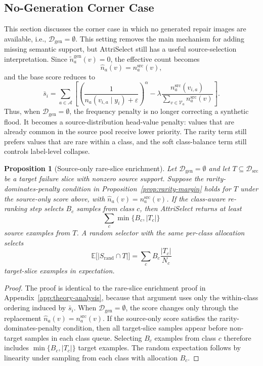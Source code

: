 \documentclass{article}
\newcommand{\model}{AttriSelect\xspace}
\newcommand{\dataset}{\mathcal{D}}
\newcommand{\attrs}{\mathcal{A}}
\newcommand{\vals}{\mathcal{V}}
\newtheorem{proposition}{Proposition}
\begin{document}
\subsection{No-Generation Corner Case}
\label{app:no-generation-corner-case}

This section discusses the corner case in which no generated repair images are available, i.e., $\dataset_{\mathrm{gen}}=\emptyset$. This setting removes the main mechanism for adding missing semantic support, but \model still has a useful source-selection interpretation. Since $\tilde{n}_a^{\mathrm{gen}}(v)=0$, the effective count becomes
\begin{equation}
\hat{n}_a(v)=n_a^{\mathrm{src}}(v),
\end{equation}
and the base score reduces to
\begin{equation}
\bar{s}_i
=
\sum_{a \in \attrs}
\left[
\left(\frac{1}{n_a(v_{i,a}\mid y_i)+\varepsilon}\right)^\alpha
-
\lambda
\frac{n_a^{\mathrm{src}}(v_{i,a})}{\sum_{v\in\vals_a} n_a^{\mathrm{src}}(v)}
\right].
\end{equation}
Thus, when $\dataset_{\mathrm{gen}}=\emptyset$, the frequency penalty is no longer correcting a synthetic flood. It becomes a source-distribution head-value penalty: values that are already common in the source pool receive lower priority. The rarity term still prefers values that are rare within a class, and the soft class-balance term still controls label-level collapse.

\begin{proposition}[Source-only rare-slice enrichment]
Let $\dataset_{\mathrm{gen}}=\emptyset$ and let $T\subseteq\dataset_{\mathrm{src}}$ be a target failure slice with nonzero source support. Suppose the rarity-dominates-penalty condition in Proposition~\ref{prop:rarity-margin} holds for $T$ under the source-only score above, with $\hat{n}_a(v)=n_a^{\mathrm{src}}(v)$. If the class-aware re-ranking step selects $B_c$ samples from class $c$, then \model returns at least
\begin{equation}
\sum_c \min\{B_c, |T_c|\}
\end{equation}
source examples from $T$. A random selector with the same per-class allocation selects
\begin{equation}
\mathbb{E}\big[|S_{\mathrm{rand}}\cap T|\big]
=
\sum_c B_c\frac{|T_c|}{N_c}
\end{equation}
target-slice examples in expectation.
\end{proposition}

\begin{proof}
The proof is identical to the rare-slice enrichment proof in Appendix~\ref{app:theory-analysis}, because that argument uses only the within-class ordering induced by $\bar{s}_i$. When $\dataset_{\mathrm{gen}}=\emptyset$, the score changes only through the replacement $\hat{n}_a(v)=n_a^{\mathrm{src}}(v)$. If the source-only score satisfies the rarity-dominates-penalty condition, then all target-slice samples appear before non-target samples in each class queue. Selecting $B_c$ examples from class $c$ therefore includes $\min\{B_c,|T_c|\}$ target examples. The random expectation follows by linearity under sampling from each class with allocation $B_c$.
\end{proof}
\end{document}
